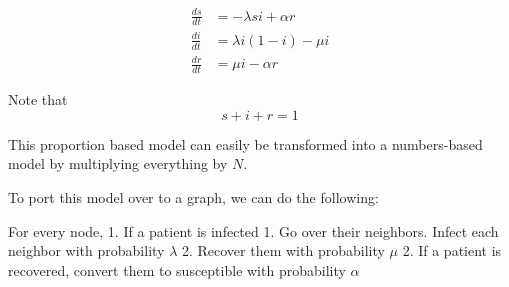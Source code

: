 \documentclass[11pt]{article}
\begin{document}
\[\begin{align} 
    \frac{ds}{dt} &= -\lambda s i + \alpha r\\ 
    \frac{di}{dt} &= \lambda i (1 - i) - \mu i \\ 
    \frac{dr}{dt} &= \mu i - \alpha r 
\end{align}\]

Note that \[s + i + r = 1\]

This proportion based model can easily be transformed into a
numbers-based model by multiplying everything by \(N\).

To port this model over to a graph, we can do the following:

For every node, 1. If a patient is infected 1. Go over their neighbors.
Infect each neighbor with probability \(\lambda\) 2. Recover them with
probability \(\mu\) 2. If a patient is recovered, convert them to
susceptible with probability \(\alpha\)
\end{document}
